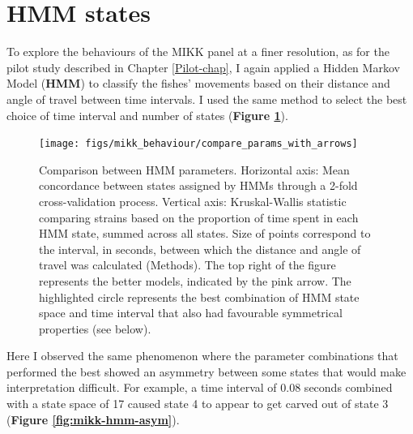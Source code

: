 \documentclass[
]{book}
\begin{document}
\clearpage

\hypertarget{hmm-states}{%
\section{HMM states}\label{hmm-states}}

To explore the behaviours of the MIKK panel at a finer resolution, as for the pilot study described in Chapter \ref{Pilot-chap}, I again applied a Hidden Markov Model (\textbf{HMM}) to classify the fishes' movements based on their distance and angle of travel between time intervals. I used the same method to select the best choice of time interval and number of states (\textbf{Figure \ref{fig:mikk-param-comp}}).



\begin{figure}
\texttt{[image: figs/mikk\_behaviour/compare\_params\_with\_arrows]} \caption{Comparison between HMM parameters. Horizontal axis: Mean concordance between states assigned by HMMs through a 2-fold cross-validation process. Vertical axis: Kruskal-Wallis statistic comparing strains based on the proportion of time spent in each HMM state, summed across all states. Size of points correspond to the interval, in seconds, between which the distance and angle of travel was calculated (Methods). The top right of the figure represents the better models, indicated by the pink arrow. The highlighted circle represents the best combination of HMM state space and time interval that also had favourable symmetrical properties (see below).}\label{fig:mikk-param-comp}
\end{figure}

Here I observed the same phenomenon where the parameter combinations that performed the best showed an asymmetry between some states that would make interpretation difficult. For example, a time interval of 0.08 seconds combined with a state space of 17 caused state 4 to appear to get carved out of state 3 (\textbf{Figure \ref{fig:mikk-hmm-asym}}).
\end{document}
